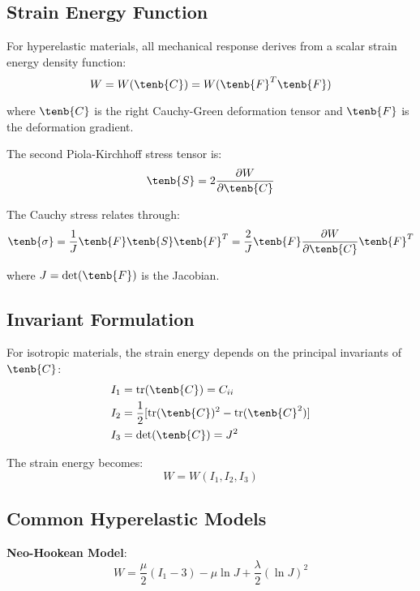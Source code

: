 \subsection{Strain Energy Function}

For hyperelastic materials, all mechanical response derives from a scalar strain energy density function:
\begin{equation}
W = W(\tenb{C}) = W(\tenb{F}^T \tenb{F})
\end{equation}

where $\tenb{C}$ is the right Cauchy-Green deformation tensor and $\tenb{F}$ is the deformation gradient.

The second Piola-Kirchhoff stress tensor is:
\begin{equation}
\tenb{S} = 2\frac{\partial W}{\partial \tenb{C}}
\end{equation}

The Cauchy stress relates through:
\begin{equation}
\tenb{\sigma} = \frac{1}{J}\tenb{F}\tenb{S}\tenb{F}^T = \frac{2}{J}\tenb{F}\frac{\partial W}{\partial \tenb{C}}\tenb{F}^T
\end{equation}

where $J = \det(\tenb{F})$ is the Jacobian.

\subsection{Invariant Formulation}

For isotropic materials, the strain energy depends on the principal invariants of $\tenb{C}$:
\begin{align}
I_1 &= \text{tr}(\tenb{C}) = C_{ii}\\
I_2 &= \frac{1}{2}[\text{tr}(\tenb{C})^2 - \text{tr}(\tenb{C}^2)]\\
I_3 &= \det(\tenb{C}) = J^2
\end{align}

The strain energy becomes:
\begin{equation}
W = W(I_1, I_2, I_3)
\end{equation}

\subsection{Common Hyperelastic Models}

\textbf{Neo-Hookean Model}:
\begin{equation}
W = \frac{\mu}{2}(I_1 - 3) - \mu \ln J + \frac{\lambda}{2}(\ln J)^2
\end{equation}


